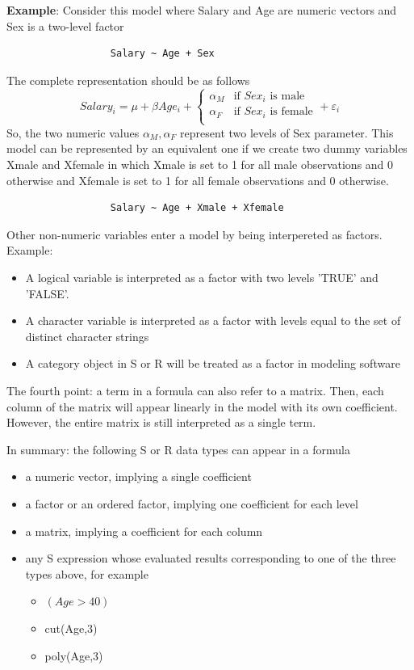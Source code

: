 {\bf Example}: Consider this model where Salary and Age are numeric
vectors and Sex is a two-level factor
\begin{verbatim}
                  Salary ~ Age + Sex
\end{verbatim}
The complete representation should be as follows
\begin{equation*}
  \label{eq:18}
  Salary_i = \mu + \beta Age_i + \left\{ \begin{array}{rl}
     \alpha_M  & \text{if } Sex_i \text{ is male} \\
     \alpha_F & \text{if } Sex_i \text{ is female} \\
\end{array} \right. + \varepsilon_i
\end{equation*}
So, the two numeric values $\alpha_M, \alpha_F$ represent two levels
of Sex parameter.  This model can be represented by an equivalent one
if we create two dummy variables Xmale and Xfemale in which Xmale is
set to 1 for all male observations and 0 otherwise and Xfemale is set
to 1 for all female observations and 0 otherwise.
\begin{verbatim}
                  Salary ~ Age + Xmale + Xfemale
\end{verbatim}
Other non-numeric variables enter a model by being interpereted as
factors. Example:
\begin{itemize}
\item A logical variable is interpreted as a factor with two
  levels 'TRUE' and 'FALSE'.

\item A character variable is interpreted as a factor with levels
  equal to the set of distinct character strings

\item A category object in S or R will be treated as a factor in
  modeling software
\end{itemize}

The fourth point: a term in a formula can also refer to a
matrix. Then, each column of the matrix will appear linearly in the
model with its own coefficient. However, the entire matrix is
still interpreted as a single term.

In summary: the following S or R data types can appear in a formula
\begin{itemize}
\item a numeric vector, implying a single coefficient

\item a factor or an ordered factor, implying one coefficient for each
  level

\item a matrix, implying a coefficient for each column

\item any S expression whose evaluated results corresponding to one of
  the three types above, for example
  \begin{itemize}
  \item $(Age > 40)$
  \item cut(Age,3)
  \item poly(Age,3)
  \end{itemize}
\end{itemize}


